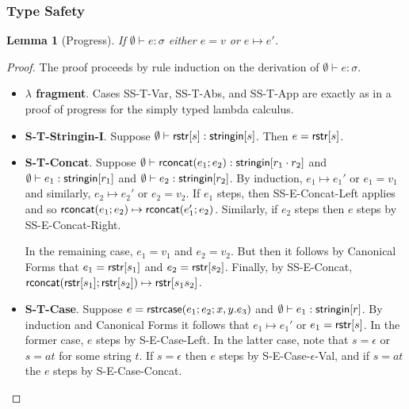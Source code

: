 \documentclass[11pt,leqno]{article}
\newtheorem{trlem}[tr]{Lemma}
\theoremstyle{definition}
\newcommand{\val}{{\sf val}}
\newcommand{\stringin}[1]{{\sf stringin}[#1]}
\newcommand{\strcase}[3]{ {\sf rstrcase}(#1; #2; #3)}
\newcommand{\lhead}[1]{ {\sf lhead}(#1) }
\newcommand{\ltail}[1]{ {\sf ltail}(#1) }
\begin{document}
\subsubsection{Type Safety}
\begin{trlem}[Progress]
If $\emptyset\vdash e : \sigma$ either $e = v$ or $e \mapsto e'$.
\end{trlem}
\begin{proof}
The proof proceeds by rule induction on the derivation of $\emptyset\vdash e : \sigma$.
\begin{itemize}[label=$ $,itemsep=1ex]
\item \textbf{$\lambda$ fragment}. Cases SS-T-Var, SS-T-Abs, and SS-T-App are exactly as in a proof of progress for
the simply typed lambda calculus.

\item \textbf{S-T-Stringin-I}. Suppose $\emptyset\vdash \rstr{s} : \stringin{s}$.
Then $e={\sf rstr}[s]$.

\item \textbf{S-T-Concat}. Suppose $\emptyset\vdash \rconcat{e_1}{e_2} : \stringin{r_1 \cdot r_2}$ and $\emptyset \vdash e_1 : \stringin{r_1}$ and $\emptyset \vdash e_2 : \stringin{r_2}$.
By induction, $e_1 \mapsto e_1'$ or $e_1 = v_1$ and similarly, $e_2 \mapsto e_2'$ or $e_2 = v_2$. 
If $e_1$ steps, then SS-E-Concat-Left applies and so
${\sf rconcat}(e_1;e_2) \mapsto {\sf rconcat}(e_1';e_2)$. Similarly, if $e_2$ steps
then $e$ steps by SS-E-Concat-Right.

In the remaining case, $e_1 =v_1$ and $e_2 =v_2$.
But then it follows by Canonical Forms that $e_1 = {\sf rstr}[s_1]$
and $e_2 = {\sf rstr}[s_2]$.
Finally, by SS-E-Concat, ${\sf rconcat}({\sf rstr}[s_1];{\sf rstr}[s_2]) \mapsto {\sf rstr}[s_1s_2]$.

\def\mline#1{\par\hspace*{-\leftmargin}\parbox{\textwidth}{\[#1\]}}
\item \textbf{S-T-Case}.
Suppose $e = \strcase{e_1}{e_2}{x,y.e_3}$ and $\emptyset\vdash e_1 : \stringin{r}$.
By induction and Canonical Forms it follows that $e_1 \mapsto e_1'$ or $e_1 = {\sf rstr}[s]$.
In the former case, $e$ steps by S-E-Case-Left.
In the latter case, note that $s = \epsilon$ or $s = at$ for some string $t$.
If $s = \epsilon$ then $e$ steps by S-E-Case-$\epsilon$-Val,
and if $s = at$ the $e$ steps by S-E-Case-Concat.


\end{itemize}
\end{proof}
\end{document}
